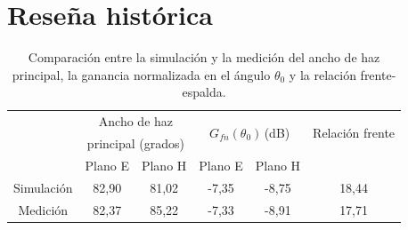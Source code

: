 

\section{Reseña histórica}
\label{sec_intro_resenia}

\begin{table}[H]
\centering
\begin{tabular}{c|c|c|cc|c|}
\cline{2-6}
& \multicolumn{2}{c|}{Ancho de haz} & \multicolumn{2}{c|}{\multirow{2}{*}{$G_{fn}\left(\theta_0\right)\,$(dB)}} & \multirow{2}{*}{Relación frente}\\
& \multicolumn{2}{c|}{principal (grados)} & & & \multirow{2}{*}{espalda (dB)}\\
\cline{2-5}
& Plano E & Plano H & \multicolumn{1}{|c|}{Plano E} & Plano H &\\
\hline
\multicolumn{1}{|c|}{Simulación} & 82,90 & 81,02 & \multicolumn{1}{|c|}{-7,35} & -8,75 & 18,44\\
\hline
\multicolumn{1}{|c|}{Medición} & 82,37 & 85,22 & \multicolumn{1}{|c|}{-7,33} & -8,91 & 17,71\\
\hline
\end{tabular}
\caption{Comparación entre la simulación y la medición del ancho de haz principal, la ganancia normalizada en el ángulo $\theta_0$ y la relación frente-espalda.}
\label{tabla_mediciones:3}
\end{table}

